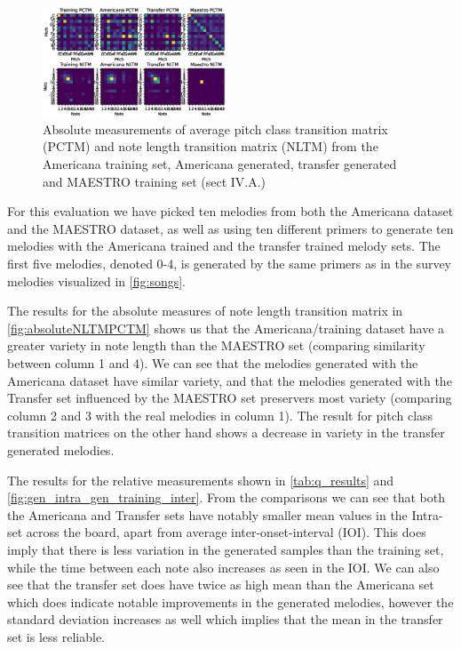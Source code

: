 \documentclass{IEEEtran}
\begin{document}
\begin{figure}
    \centering
    \includegraphics[width=0.485\textwidth]{PCTMNLTM.eps}
    \caption{
        Absolute measurements of average pitch class transition matrix
        (PCTM) and note length transition matrix (NLTM) from the Americana
        training set, Americana generated, transfer generated and MAESTRO
        training set (sect IV.A.)
        \label{fig:absoluteNLTMPCTM}
    }
\end{figure}

For this evaluation we have picked ten melodies from both the Americana
dataset and the MAESTRO dataset, as well as using ten different primers to
generate ten melodies with the Americana trained and the transfer trained
melody sets. The first  five melodies, denoted 0-4, is generated by the
same primers as in the survey melodies visualized in \autoref{fig:songs}.

The results for the absolute measures of note length transition matrix
in \autoref{fig:absoluteNLTMPCTM} shows us that the Americana/training dataset have
a greater variety in note length than the MAESTRO set (comparing similarity 
between column 1 and 4). We can see that the
melodies generated with the Americana dataset have similar variety, and that
the melodies generated with the Transfer set influenced by the MAESTRO set preservers
most variety (comparing column 2 and 3 with the real melodies in column 1). 
The result for pitch class transition matrices on the other
hand shows a decrease in variety in the transfer generated melodies.

The results for the relative measurements shown in \autoref{tab:q_results}
and \autoref{fig:gen_intra_gen_training_inter}. From the comparisons we
can see that both the Americana and Transfer sets have notably smaller mean
values in the Intra-set across the board, apart from average
inter-onset-interval (IOI). This does imply that there is less variation in
the generated samples than the training set, while the time between each note
also increases as seen in the IOI. We can also see that the transfer set does
have twice as high mean than the Americana set which does indicate notable
improvements in the generated melodies, however the standard deviation
increases as well which implies that the mean in the transfer set is less
reliable.
\end{document}
